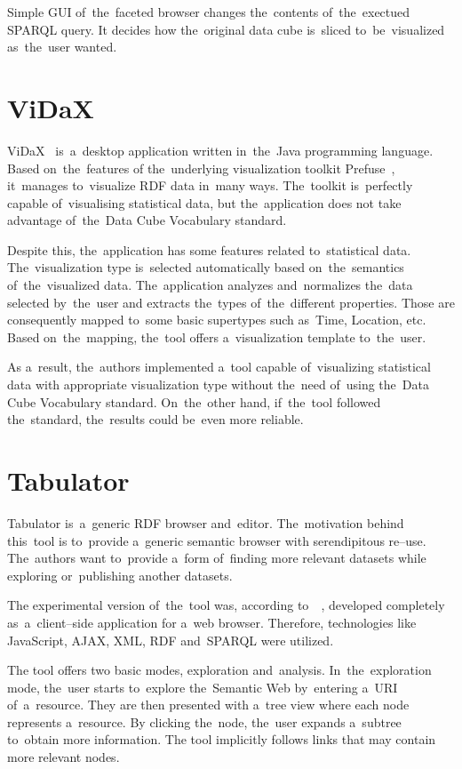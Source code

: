 Simple GUI of~the~faceted browser changes the~contents of~the~exectued SPARQL query. 
It decides how the~original data cube is~sliced to~be~visualized as~the~user 
wanted.

\section{ViDaX}
ViDaX~\cite{vidax} is~a~desktop application written in~the~Java programming language. Based on~the~features
of the~underlying visualization toolkit Prefuse~\cite{prefuse}, it~manages to~visualize RDF data in~many ways. The~toolkit is~perfectly capable of~visualising statistical data, but the~application does not take advantage of~the~Data Cube Vocabulary standard.

Despite this, the~application has some features related to~statistical 
data. The~visualization type is~selected automatically based on~the~semantics of~the~visualized data. The~application analyzes and~normalizes the~data selected by~the~user 
and extracts the~types of~the~different properties. Those are consequently mapped to~some basic supertypes such as~Time, Location, etc. Based on~the~mapping,
the~tool offers a~visualization template to~the~user.

As a~result, the~authors implemented a~tool capable of~visualizing 
statistical data with appropriate visualization type without the~need of~using 
the~Data Cube Vocabulary standard. On~the~other hand, if~the~tool 
followed the~standard, the~results could be~even more reliable.

\section{Tabulator}
\label{sec:rw:tabulator}
Tabulator is~a~generic RDF browser and~editor. The~motivation behind this~tool
is to~provide a~generic semantic browser with serendipitous re--use. The~authors 
want to~provide a~form of~finding more relevant datasets while exploring or~publishing another datasets. 

The experimental version of~the~tool was, according to~~\cite{tabulator-paper}, 
developed completely as~a~client--side application for a~web browser. Therefore, 
technologies like JavaScript, AJAX, XML, RDF and~SPARQL were utilized.

The tool offers two basic modes, exploration and~analysis. In~the~exploration mode,
the~user starts to~explore the~Semantic Web by~entering a~URI of~a~resource. They 
are then presented with a~tree view where each node represents a~resource. 
By clicking the~node, the~user expands a~subtree to~obtain more information.
The tool implicitly follows links that may contain more relevant nodes.

